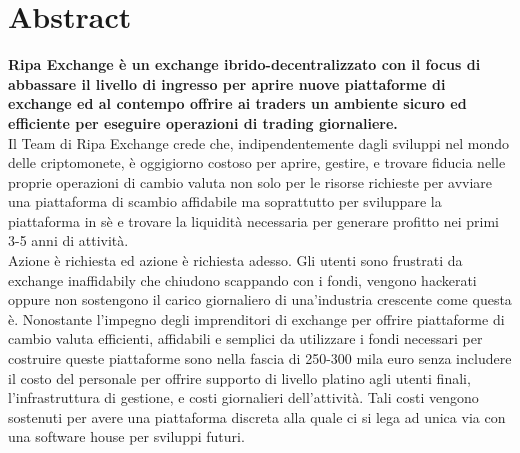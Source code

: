 \documentclass[11pt,fleqn,oneside]{book} %
\begin{document}

\begingroup
\thispagestyle{empty}
\endgroup

\newpage

\usechapterimagefalse %
\chapter{Abstract}
\textbf{Ripa Exchange è un exchange ibrido-decentralizzato con il focus di abbassare il livello di ingresso per aprire 
nuove piattaforme di exchange ed al contempo offrire ai traders un ambiente sicuro ed efficiente per eseguire operazioni di 
trading giornaliere.}\\

Il Team di Ripa Exchange crede che, indipendentemente dagli sviluppi nel mondo delle criptomonete, è oggigiorno costoso per aprire,
gestire, e trovare fiducia nelle proprie operazioni di cambio valuta non solo per le risorse richieste per avviare
una piattaforma di scambio affidabile ma soprattutto per sviluppare la piattaforma in sè e trovare la liquidità 
necessaria per generare profitto nei primi 3-5 anni di attività.\\

Azione è richiesta ed azione è richiesta adesso. Gli utenti sono frustrati da exchange inaffidabily che chiudono scappando con i 
fondi, vengono hackerati oppure non sostengono il carico giornaliero di una'industria crescente come questa è.
Nonostante l'impegno degli imprenditori di exchange per offrire piattaforme di cambio valuta efficienti, affidabili e 
semplici da utilizzare i fondi necessari per costruire queste piattaforme sono nella fascia di 250-300 mila euro senza includere
il costo del personale per offrire supporto di livello platino agli utenti finali, l'infrastruttura di gestione, e costi giornalieri
dell'attività. Tali costi vengono sostenuti per avere una piattaforma discreta alla quale ci si lega ad unica via con una software
house per sviluppi futuri.\\
\end{document}
